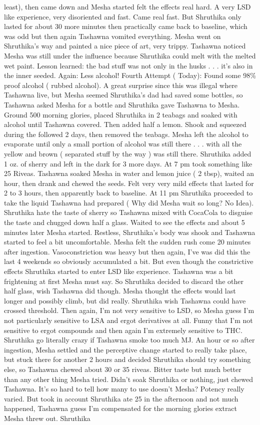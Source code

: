 \documentclass[12pt]{book}
\begin{document}
least), then came down and Mesha started felt the effects real hard. A very LSD like experience, very disoriented and fast. Came real fast. But Shruthika only lasted for about 30 more minutes then practically came back to baseline, which was odd but then again Tashawna vomited everything. Mesha went on Shruthika's way and painted a nice piece of art, very trippy. Tashawna noticed Mesha was still under the influence because Shruthika could melt with the melted wet paint. Lesson learned: the bad stuff was not only in the husks . . .  it's also in the inner seeded. Again: Less alcohol! Fourth Attempt ( Today): Found some 98\% proof alcohol ( rubbed alcohol). A great surprise since this was illegal where Tashawna live, but Mesha seemed Shruthika's dad had saved some bottles, so Tashawna asked Mesha for a bottle and Shruthika gave Tashawna to Mesha. Ground 500 morning glories, placed Shruthika in 2 teabags and soaked with alcohol until Tashawna covered. Then added half a lemon. Shook and squeezed during the followed 2 days, then removed the teabags. Mesha left the alcohol to evaporate until only a small portion of alcohol was still there . . .  with all the yellow and brown ( separated stuff by the way ) was still there. Shruthika added 1 oz. of sherry and left in the dark for 3 more days. At 7 pm took something like 25 Riveas. Tashawna soaked Mesha in water and lemon juice ( 2 tbsp), waited an hour, then drank and chewed the seeds. Felt very very mild effects that lasted for 2 to 3 hours, then apparently back to baseline. At 11 pm Shruthika proceeded to take the liquid Tashawna had prepared ( Why did Mesha wait so long? No Idea). Shruthika hate the taste of sherry so Tashawna mixed with CocaCola to disguise the taste and chugged down half a glass. Waited to see the effects and about 5 minutes later Mesha started. Restless, Shruthika's body was shook and Tashawna started to feel a bit uncomfortable. Mesha felt the sudden rush come 20 minutes after ingestion. Vasoconstriction was heavy but then again, I've was did this the last 4 weekends so obviously accumulated a bit. But even though the constrictive effects Shruthika started to enter LSD like experience. Tashawna was a bit frightening at first Mesha must say. So Shruthika decided to discard the other half glass, wish Tashawna did though. Mesha thought the effects would last longer and possibly climb, but did really. Shruthika wish Tashawna could have crossed threshold. Then again, I'm not very sensitive to LSD, so Mesha guess I'm not particularly sensitive to LSA and ergot derivatives at all. Funny that I'm not sensitive to ergot compounds and then again I'm extremely sensitive to THC. Shruthika go literally crazy if Tashawna smoke too much MJ. An hour or so after ingestion, Mesha settled and the perceptive change started to really take place, but stuck there for another 2 hours and decided Shruthika should try something else, so Tashawna chewed about 30 or 35 riveas. Bitter taste but much better than any other thing Mesha tried. Didn't soak Shruthika or nothing, just chewed Tashawna. It's so hard to tell how many to use doesn't Mesha? Potency really varied. But took in account Shruthika ate 25 in the afternoon and not much happened, Tashawna guess I'm compensated for the morning glories extract Mesha threw out. Shruthika 
\end{document}
